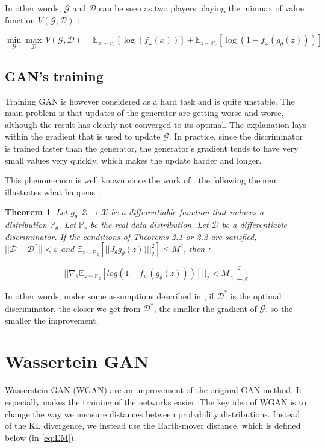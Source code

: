 \documentclass[a4paper]{article}
\newcommand{\G}{\mathcal{G}}
\newcommand{\D}{\mathcal{D}}
\newcommand{\X}{\mathcal{X}}
\newcommand{\Expec}{\mathbb{E}}
\newcommand{\Prob}{\mathbb{P}}
\theoremstyle{plain}
\newtheorem{thm}{Theorem}
\theoremstyle{remark}
\theoremstyle{definition}
\begin{document}
In other words, $\G$ and $\D$ can be seen as two players playing the minmax of value function $V(\G,\D)$ :

\begin{equation}
\label{eq:zero_sum_game}
\min_{\G} \max_{\D} \, V(\G,\D) = \Expec_{x \sim \Prob_r}[\log(f_\omega(x))] + \Expec_{z \sim \Prob_z}[\log(1 - f_\omega(g_\theta(z)))]
\end{equation}

\subsection{GAN's training}
\label{sec:vanish}
Training GAN is however considered as a hard task and is quite unstable. The main problem is that updates of the generator are getting worse and worse, although the result has clearly not converged to its optimal. The explanation lays within the gradient that is used to update $\G$. In practice, since the discriminator is trained faster than the generator, the generator's gradient tends to have very small values very quickly, which makes the update harder and longer.

This phenomenom is well known since the work of \cite{arjovsky2017towards}. the following theorem illustrates what happens :

\begin{thm}
Let $g_\theta : \mathcal{Z} \rightarrow \X$ be a differentiable function that induces  a  distribution $\Prob_\theta$. Let $\Prob_r$ be  the  real  data  distribution. Let $\D$ be a differentiable discriminator.  If the conditions of Theorems 2.1 or 2.2 are satisfied, $||\D - \D^*|| < \varepsilon$ and $\Expec_{z \sim \Prob_z}[ ||J_\theta g_\theta(z))||^2_2] \leqslant M^2$, then :

$$ || \nabla_\theta \Expec_{z \sim \Prob_z} [log(1- f_w(g_\theta(z)))] ||_2  < M \frac{\varepsilon}{1-\varepsilon}$$ 
\end{thm}

In other words, under some assumptions described in \cite{arjovsky2017wasserstein}, if $\D^*$ is the optimal discriminator, the closer we get from $\D^*$, the smaller the gradient of $\G$, so the smaller the improvement.

\section{Wassertein GAN}

Wasserstein GAN (WGAN) are an improvement of the original GAN method. It especially makes the training of the networks easier. The key idea of WGAN is to change the way we measure distances between probability distributions. Instead of the KL divergence, we instead use the Earth-mover distance, which is defined below (in \ref{eq:EM}).
\end{document}
